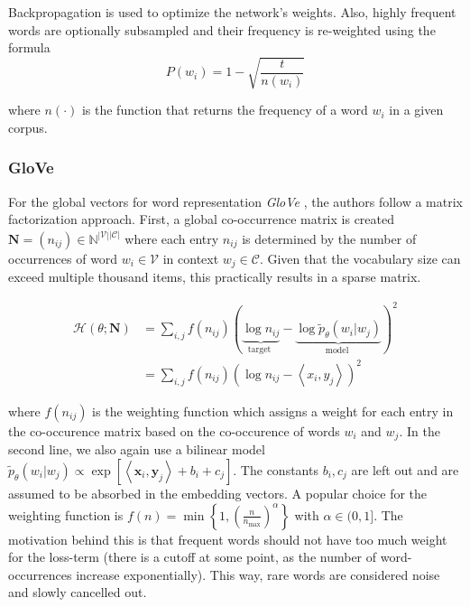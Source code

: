 \documentclass[a4paper,12pt,oneside,openright]{report}
\begin{document}
Backpropagation is used to optimize the network's weights. 
Also, highly frequent words are optionally subsampled and their frequency is re-weighted using the formula $$
P\left(w_{i}\right)=1-\sqrt{\frac{t}{n\left(w_{i}\right)}}
$$

where $n( \cdot )$ is the function that returns the frequency of a word $w_i$ in a given corpus.

\subsubsection{GloVe}

For the global vectors for word representation \textit{GloVe} \cite{pennington14}, the authors follow a matrix factorization approach.
First, a global co-occurrence matrix is created $\mathbf{N} = (n_{ij}) \in \mathbb{N}^{|\mathcal{V}| \dot |\mathcal{C}|}$ where each entry $n_{ij}$ is determined by the number of occurrences of word $w_i \in \mathcal{V}$ in context $w_j \in \mathcal{C}$.
Given that the vocabulary size can exceed multiple thousand items, this practically results in a sparse matrix.

\begin{align}
\mathcal{H}(\theta ; \mathbf{N}) &=
\sum_{i, j} f\left(n_{i j}\right)(\underbrace{\log n_{i j}}_{\text {target }}-\underbrace{\log \tilde{p}_{\theta}\left(w_{i} | w_{j}\right)}_{\text {model }})^{2} \nonumber \\
&= \sum_{i, j} f\left(n_{i j}\right)(\log n_{i j} - \left\langle x_i, y_j \right\rangle )^{2} \nonumber
\end{align}

where $f(n_{ij})$ is the weighting function which assigns a weight for each entry in the co-occurence matrix based on the co-occurence of words $w_i$ and $w_j$. 
In the second line, we also again use a bilinear model $\tilde{p}_{\theta}\left(w_{i} | w_{j}\right) \propto \exp \left[\left\langle\mathbf{x}_{i}, \mathbf{y}_{j}\right\rangle+b_{i}+c_{j}\right]$.
The constants $b_i, c_j$ are left out and are assumed to be absorbed in the embedding vectors.
A popular choice for the weighting function is 
$
f(n) = \min \left\lbrace 1, \left(\frac{n}{n_{\max}}\right)^{\alpha} \right\rbrace
$
with $\alpha \in (0, 1]$.
The motivation behind this is that frequent words should not have too much weight for the loss-term (there is a cutoff at some point, as the number of word-occurrences increase exponentially).
This way, rare words are considered noise and slowly cancelled out. \\
\end{document}
